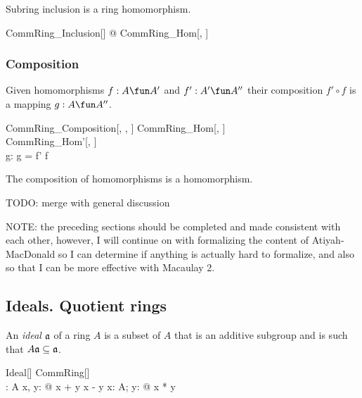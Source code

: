 \documentclass{amsart}
\begin{document}
\begin{remark}
Subring inclusion is a ring homomorphism.

\begin{zed}
\forall CommRing\_Inclusion[\setT] @ CommRing\_Hom[\setT, \setT]
\end{zed}

\end{remark}

\subsubsection{Composition}

Given homomorphisms $f : A \fun A'$ and $f': A' \fun A''$ their composition 
$f' \circ f$ is a mapping $g: A \fun A''$.

\begin{schema}{CommRing\_Composition}[\genT, \genU, \genV]
	CommRing\_Hom[\genT, \genU] \\
	CommRing\_Hom'[\genU, \genV] \\
	g: \genT \pfun \genV
\where
	g = f' \circ f
\end{schema}

\begin{remark}
The composition of homomorphisms is a homomorphism.
\end{remark}

TODO: merge with general discussion

NOTE: the preceding sections should be completed and made consistent with each other,
however, I will continue on with formalizing the content of Atiyah-MacDonald so I can determine
if anything is actually hard to formalize, and also so that I can be more effective with Macaulay 2.

\subsection{Ideals. Quotient rings}

An \textit{ideal} $\mathfrak{a}$ of a ring $A$ is a subset of $A$ that is an additive subgroup
and is such that $A\mathfrak{a} \subseteq \mathfrak{a}$.

\begin{schema}{Ideal}[\genT]
	CommRing[\genT] \\
	\fraka: \power \genT
\where
	\fraka \subseteq A
\also
	\forall x, y: \fraka @ x + y \in \fraka \land x - y \in \fraka
\also
	\forall x: A; y: \fraka @ x * y \in \fraka
\end{schema}
\end{document}
